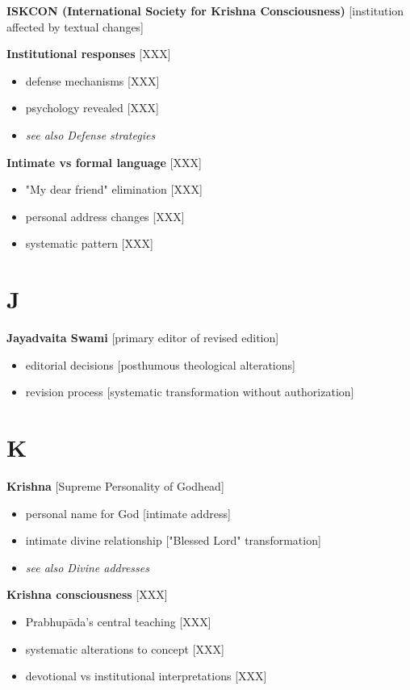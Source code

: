 \documentclass[11pt,twoside]{book}
\begin{document}
\textbf{\textbf{ISKCON (International Society for Krishna Consciousness)}} {[}institution affected by textual changes]

\textbf{\textbf{Institutional responses}} {[}XXX]
\begin{itemize}
\item defense mechanisms [XXX]
\item psychology revealed [XXX]
\item \emph{see also Defense strategies}
\end{itemize}

\textbf{\textbf{Intimate vs formal language}} {[}XXX]
\begin{itemize}
\item "My dear friend" elimination [XXX]
\item personal address changes [XXX]
\item systematic pattern [XXX]
\end{itemize}
\section*{J}
\label{sec:org94cb207}

\textbf{\textbf{Jayadvaita Swami}} {[}primary editor of revised edition]
\begin{itemize}
\item editorial decisions [posthumous theological alterations]
\item revision process [systematic transformation without authorization]
\end{itemize}
\section*{K}
\label{sec:orge4204cd}

\textbf{\textbf{Krishna}} {[}Supreme Personality of Godhead]
\begin{itemize}
\item personal name for God [intimate address]
\item intimate divine relationship ["Blessed Lord" transformation]
\item \emph{see also Divine addresses}
\end{itemize}

\textbf{\textbf{Krishna consciousness}} {[}XXX]
\begin{itemize}
\item Prabhupāda's central teaching [XXX]
\item systematic alterations to concept [XXX]
\item devotional vs institutional interpretations [XXX]
\end{itemize}
\end{document}
